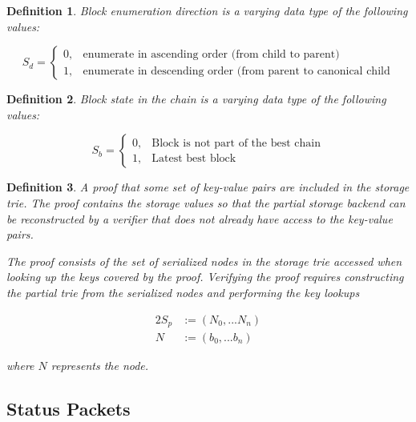 \documentclass{book}
\newtheorem{definition}{Definition}
\begin{document}
\begin{definition}
    \label{defn-sequence-direction}
    Block enumeration direction is a varying data type of the following values:

    \begin{equation*}
      S_d =
      \begin{cases}
        0, & \text{enumerate in ascending order (from child to parent)} \\
        1, & \text{enumerate in descending order (from parent to canonical child}
      \end{cases}
    \end{equation*}
\end{definition}

\begin{definition}
    \label{defn-block-state}
    Block state in the chain is a varying data type of the following values:

    \begin{equation*}
      S_b =
      \begin{cases}
        0, & \text{Block is not part of the best chain} \\
        1, & \text{Latest best block}
      \end{cases}
    \end{equation*}
\end{definition}

\begin{definition}
    \label{defn-storage-proof}
    A proof that some set of key-value pairs are included in the storage trie. The proof contains
    the storage values so that the partial storage backend can be reconstructed by a verifier that
    does not already have access to the key-value pairs.
    \newline

    The proof consists of the set of serialized nodes in the storage trie accessed when looking up
    the keys covered by the proof. Verifying the proof requires constructing the partial trie from
    the serialized nodes and performing the key lookups

    \begin{alignat*}{2}
        S_p &:= (N_0, ... N_n) \\
        N &:= (b_0, ... b_n)
    \end{alignat*}

    where $N$ represents the node.
\end{definition}

\subsection{Status Packets}
\end{document}

